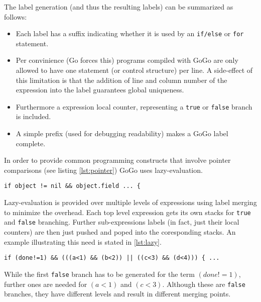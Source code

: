 \documentclass[a4paper]{scrreprt}
\begin{document}
      The label generation (and thus the resulting labels) can be summarized as 
      follows:
      \begin{itemize}
        \item Each label has a suffix indicating whether it is used by an 
          \texttt{if/else} or \texttt{for} statement.
        \item Per convinience (Go forces this) programs compiled with GoGo
          are only allowed to have one statement (or control structure) per 
          line. A side-effect of this limitation is that the addition of line
          and column number of the expression into the label guarantees global
          uniqueness.
        \item Furthermore a expression local counter, representing a \texttt{true} 
          or \texttt{false} branch is included.
        \item A simple prefix (used for debugging readability) makes a GoGo
          label complete.
      \end{itemize}

      In order to provide common programming constructs that involve pointer 
      comparisons (see listing \ref{lst:pointer}) GoGo uses lazy-evaluation.

      \begin{lstlisting}[label=lst:pointer,caption=Pointer comparison]
if object != nil && object.field ... {
      \end{lstlisting}

      Lazy-evaluation is provided over multiple levels of expressions using
      label merging to minimize the overhead. Each top level expression gets 
      its own stacks for \texttt{true} and \texttt{false} branching. Further 
      sub-expressions labels (in fact, just their local counters) are then just 
      pushed and poped into the coresponding stacks. An example illustrating 
      this need is stated in \ref{lst:lazy}.
      \begin{lstlisting}[caption=Lazy-evaluation over multiple expression levels, label=lst:lazy]
if (done!=1) && (((a<1) && (b<2)) || ((c<3) && (d<4))) { ...
      \end{lstlisting}
      While the first \texttt{false} branch has to be generated for the term
      $(done!=1)$, further ones are needed for $(a<1)$ and $(c<3)$. Although these are
      \texttt{false} branches, they have different levels and result in different
      merging points.
\end{document}
